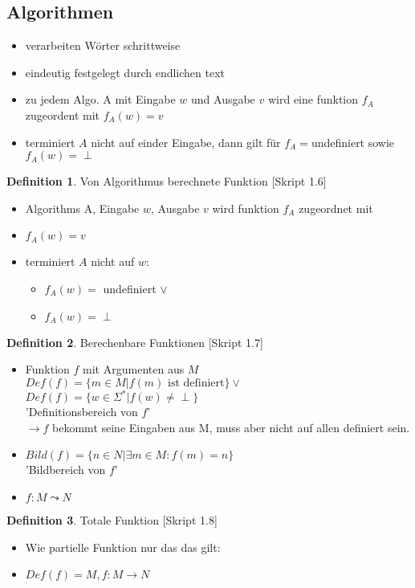 \documentclass[a4paper, 10pt]{article}
\theoremstyle{definition}
\newtheorem{definition}{Definition}[section]
\newcommand{\kleene}{\Sigma^*}
\begin{document}
\subsection{Algorithmen}
\begin{itemize}
    \item verarbeiten Wörter schrittweise
    \item eindeutig festgelegt durch endlichen text
    \item zu jedem Algo. A mit Eingabe $w$ und Ausgabe $v$ wird eine funktion $f_A$ zugeordent mit $f_A(w)=v$
    \item terminiert $A$ nicht auf einder Eingabe, dann gilt für $f_A=$undefiniert sowie $f_A(w)=\perp$
\end{itemize}
\begin{definition}{Von Algorithmus berechnete Funktion }[Skript 1.6]\begin{itemize}
    \item Algorithms A, Eingabe $w$, Ausgabe $v$ wird funktion $f_A$ zugeordnet mit
    \item $f_A(w)=v$
    \item terminiert $A$ nicht auf $w$: \begin{itemize}
        \item $f_A(w)=$ undefiniert $\lor$
        \item $f_A(w)=\perp$
    \end{itemize}
\end{itemize}
\end{definition}
\begin{definition}{Berechenbare Funktionen }[Skript 1.7]
    \begin{itemize}
        \item Funktion $f$ mit Argumenten aus $M$\\
        $Def(f)=\{m\in M|f(m)\text{ ist definiert}\} \lor$\\
        $Def(f)=\{w\in\kleene|f(w)\neq\perp\}$\\
        'Definitionsbereich von $f$'\\
        $\rightarrow f$ bekommt seine Eingaben aus M, muss aber nicht auf allen definiert sein.
        \item $Bild(f)=\{n\in N|\exists m\in M:f(m)=n\}$\\
        'Bildbereich von $f$'
        \item $f:M\leadsto N$
    \end{itemize}
\end{definition}
\begin{definition}{Totale Funktion }[Skript 1.8]
\begin{itemize}
    \item Wie partielle Funktion nur das das gilt:
    \item $Def(f)=M,f:M\to N$
\end{itemize}
\end{definition}
\end{document}
